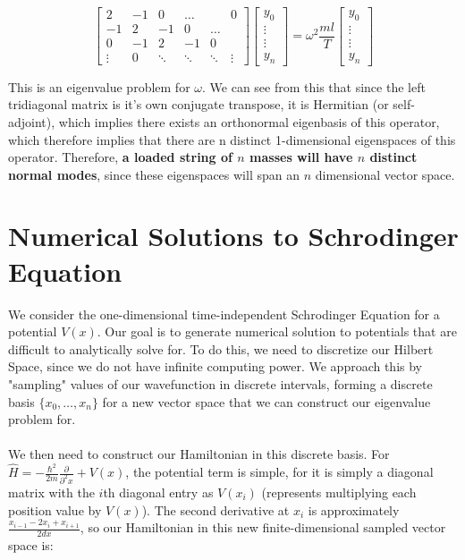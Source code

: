 \documentclass[12pt]{amsart}
\theoremstyle{definition}
\theoremstyle{remark}
\begin{document}
\begin{center}
    \[
        \begin{bmatrix}
            2 & -1 & 0 &  \dots &&0 \\ 
            -1 & 2 & -1 & 0 & \dots \\ 
            0 & -1 & 2 & -1 & 0 &  \\ 
            \vdots & 0 & \ddots & \ddots & \ddots & \vdots      
        \end{bmatrix}
        \begin{bmatrix}
            y_0 \\
            \vdots \\
            \vdots \\
            y_n
        \end{bmatrix}
        = 
        \omega^2 \frac{ml}{T}
        \begin{bmatrix}
            y_0 \\
            \vdots \\
            \vdots \\
            y_n
        \end{bmatrix}
    \]
\end{center}
\vspace{.25in}
This is an eigenvalue problem for $\omega$. We can see from this that since the left tridiagonal matrix 
is it's own conjugate transpose, it is Hermitian (or self-adjoint), which implies there exists an orthonormal eigenbasis of 
this operator, which therefore implies that there are n distinct 1-dimensional eigenspaces of this operator. Therefore, \textbf{a loaded string 
of $n$ masses will have $n$ distinct normal modes}, since these eigenspaces will span an $n$ dimensional vector space. 

\section{Numerical Solutions to Schrodinger Equation}

We consider the one-dimensional time-independent Schrodinger Equation for a potential $V(x)$. Our goal is to 
generate numerical solution to potentials that are difficult to analytically solve for. To do this, we need to 
discretize our Hilbert Space, since we do not have infinite computing power. We approach this by "sampling" values
of our wavefunction in discrete intervals, forming a discrete basis  $\{x_0, \dots, x_n\}$ for a new vector space that we can construct our 
eigenvalue problem for.\\ 
\\ 
We then need to construct our Hamiltonian in this discrete basis. For $\hat H = -\frac{\hbar^2}{2m} \frac{\partial}{\partial^2x} + V(x)$, the potential term 
is simple, for it is simply a diagonal matrix with the $i$th diagonal entry as $V(x_i)$ (represents multiplying each position value by $V(x)$). The second derivative 
at $x_i$ is approximately $\frac{x_{i-1}-2x_{i}+x_{i+1}}{2dx}$, so our Hamiltonian in this new finite-dimensional sampled vector space is:
\end{document}
